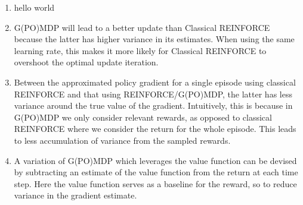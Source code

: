 \documentclass{article}
\begin{document}
\begin{enumerate}
\begin{enumerate}
	      \end{enumerate}
	\item hello world
	\item G(PO)MDP will lead to a better update than Classical REINFORCE because the latter has higher
	      variance in its estimates. When using the same learning rate, this makes it more likely for
	      Classical REINFORCE to overshoot the optimal update iteration.
	\item Between the approximated policy gradient for a single episode using classical REINFORCE and
	      that using REINFORCE/G(PO)MDP, the latter has less variance around the true value of the
	      gradient. Intuitively, this is because in G(PO)MDP we only consider relevant rewards, as
	      opposed to classical REINFORCE where we consider the return for the whole episode. This
	      leads to less accumulation of variance from the sampled rewards.
	\item A variation of G(PO)MDP which leverages the value function can be devised by subtracting an
	      estimate of the value function from the return at each time step. Here the value function
	      serves as a baseline for the reward, so to reduce variance in the gradient estimate.
\end{enumerate}
\end{document}
